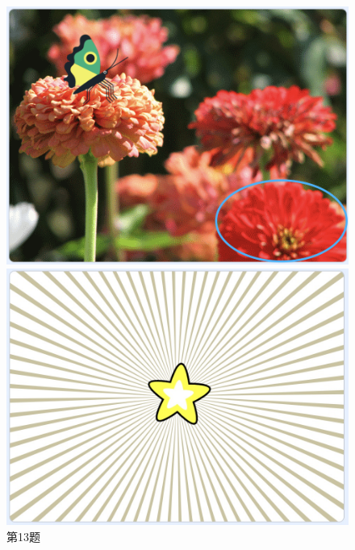 \documentclass[10pt, a4paper]{article}
\begin{document}
\begin{enumerate}
        \begin{figure}[htbp]
            \centering
            \begin{minipage}[t]{.25\textwidth}
                \centering
                \includegraphics[width=\textwidth]{13.png}
                \caption*{第13题}
            \end{minipage}
            \begin{minipage}[t]{.35\textwidth}
                \centering
                \begin{minipage}[t]{.7\textwidth}
                    \centering
                    \includegraphics[width=\textwidth]{14.jpg}
                \end{minipage}

\end{minipage}
\end{figure}
\end{enumerate}
\end{document}
